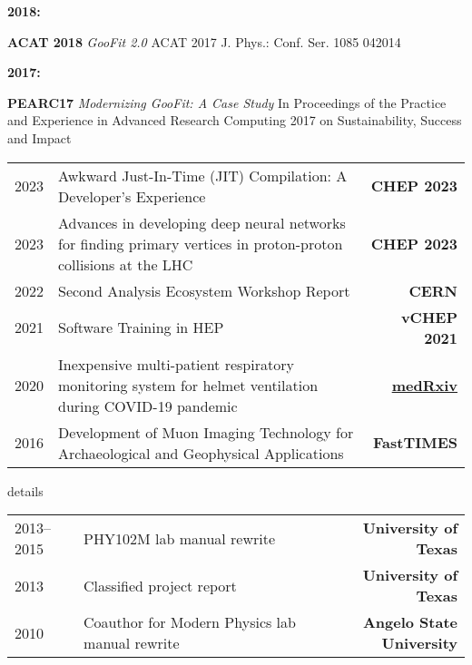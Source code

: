 \documentclass[10pt,letterpaper]{moderncv}
\begin{document}
\begin{minipage}[t]{.06\textwidth}
\textbf{2018:}
\end{minipage}%
\begin{minipage}[t]{.94\textwidth}
\textbf{ACAT 2018} \emph{GooFit 2.0} ACAT 2017 J. Phys.: Conf. Ser. 1085 042014
\end{minipage}

\begin{minipage}[t]{.06\textwidth}
\textbf{2017:}
\end{minipage}%
\begin{minipage}[t]{.94\textwidth}
\textbf{PEARC17} \emph{Modernizing GooFit: A Case Study} In Proceedings of the Practice and Experience in Advanced Research Computing 2017 on Sustainability, Success and Impact
\end{minipage}


\begin{tabularx}{\textwidth}{p{.5in}X>{\bfseries}r}
2023 & Awkward Just-In-Time (JIT) Compilation: A Developer's Experience & CHEP 2023 \\
2023 & Advances in developing deep neural networks for finding primary vertices in proton-proton collisions at the LHC & CHEP 2023 \\
2022 & Second Analysis Ecosystem Workshop Report & CERN \\
2021 & Software Training in HEP & vCHEP 2021 \\
2020 & Inexpensive multi-patient respiratory monitoring system for helmet ventilation during COVID-19 pandemic & \href{https://doi.org/10.1101/2020.06.29.20141283}{medRxiv} \\
2016 & Development of Muon Imaging Technology
for Archaeological and Geophysical Applications & FastTIMES \\
%
\end{tabularx}

\begin{taggedblock}{details}
\begin{tabularx}{\textwidth}{p{.8in}X>{\bfseries}r}
2013--2015 & PHY102M lab manual rewrite & University of Texas \\
2013 & Classified project report & University of Texas\\
2010 & Coauthor for Modern Physics lab manual rewrite & Angelo State University\\
\end{tabularx}
\end{taggedblock}
\end{document}
